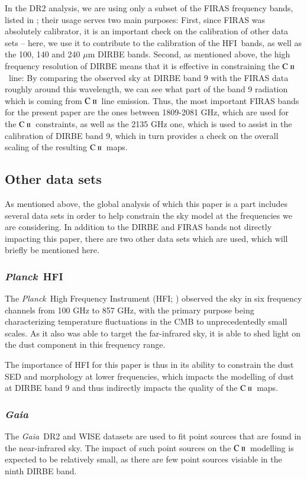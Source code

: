 \documentclass{aa}
\newcommand{\mathsc}[1]{{\normalfont\textsc{#1}}}
\def\Planck{\textit{Planck}}
\def\Gaia{\textit{Gaia}}
\def\WISE{WISE}
\newcommand{\cii}{\ensuremath{\mathsc {C\ ii}}}
\newcommand{\hfi}[0]{HFI}
\begin{document}
In the DR2 analysis, we are using only a subset of the FIRAS frequency bands, listed in \citet{CG02_01}; their usage serves two main purposes: First, since FIRAS was absolutely calibrator, it is an important check on the calibration of other data sets -- here, we use it to contribute to the calibration of the \hfi\ bands, as well as the 100, 140 and 240 $\mu$m DIRBE bands. Second, as mentioned above, the high frequency resolution of DIRBE means that it is effective in constraining the \cii\ line: By comparing the observed sky at DIRBE band 9 with the FIRAS data roughly around this wavelength, we can see what part of the band 9 radiation which is coming from \cii\ line emission. Thus, the most important FIRAS bands for the present paper are the ones between 1809-2081 GHz, which are used for the \cii\ constraints, as well as the 2135 GHz one, which is used to assist in the calibration of DIRBE band 9, which in turn provides a check on the overall scaling of the resulting \cii\ maps.

\subsection{Other data sets}
As mentioned above, the global analysis of which this paper is a part includes several data sets in order to help constrain the sky model at the frequencies we are considering. In addition to the DIRBE and FIRAS bands not directly impacting this paper, there are two other data sets which are used, which will briefly be mentioned here.

\subsubsection{\Planck\ HFI}
The \Planck\ High Frequency Instrument (HFI; \citealt{planck2016-l03}) observed
the sky in six frequency channels from 100 GHz to 857 GHz, with the primary
purpose being characterizing temperature fluctuations in the CMB to
unprecedentedly small scales. As it also was able to target the far-infrared
sky, it is able to shed light on the dust component in this frequency range.

The importance of HFI for this paper is thus in its ability to constrain the
dust SED and morphology at lower frequencies, which impacts the modelling of
dust at DIRBE band 9 and thus indirectly impacts the quality of the \cii\ maps.

\subsubsection{\Gaia}
The \Gaia\ DR2 \citep{gaia:2016,gaia:2018} and \WISE \citep{wright:2010}
datasets are used to fit point sources that are found in the near-infrared sky.
The impact of such point sources on the \cii\ modelling is expected to be
relatively small, as there are few point sources visiable in the ninth DIRBE
band.
\end{document}
